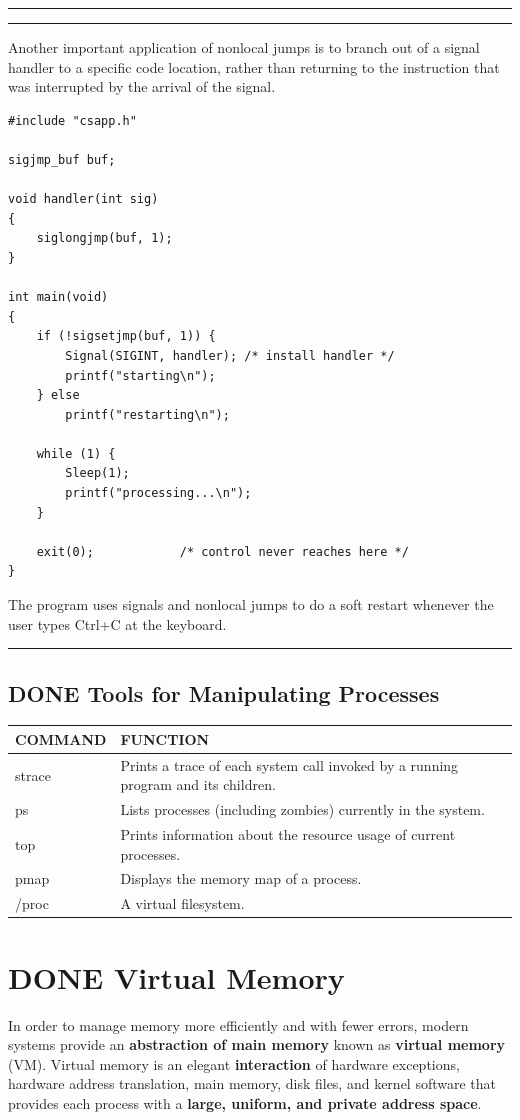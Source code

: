 \documentclass[11pt]{article}
\begin{document}
\noindent\rule{\textwidth}{0.5pt}

\noindent\rule{\textwidth}{0.5pt}
Another important application of nonlocal jumps is to branch out of a signal handler to a specific code location, rather than returning to the instruction that was interrupted by the arrival of the signal.\\
\begin{verbatim}
#include "csapp.h"

sigjmp_buf buf;

void handler(int sig)
{
    siglongjmp(buf, 1);
}

int main(void)
{
    if (!sigsetjmp(buf, 1)) {
        Signal(SIGINT, handler); /* install handler */
        printf("starting\n");
    } else
        printf("restarting\n");

    while (1) {
        Sleep(1);
        printf("processing...\n");
    }

    exit(0);			/* control never reaches here */
}

\end{verbatim}

The program uses signals and nonlocal jumps to do a soft restart whenever the user types Ctrl+C at the keyboard.\\

\noindent\rule{\textwidth}{0.5pt}


\subsection{{\bfseries\sffamily DONE} Tools for Manipulating Processes}
\label{sec:org25badc1}
\begin{center}
\begin{tabular}{ll}
COMMAND & FUNCTION\\
\hline
strace & Prints a trace of each system call invoked by a running program and its children.\\
ps & Lists processes (including zombies) currently in the system.\\
top & Prints information about the resource usage of current processes.\\
pmap & Displays the memory map of a process.\\
/proc & A virtual filesystem.\\
\end{tabular}
\end{center}




\section{{\bfseries\sffamily DONE} Virtual Memory}
\label{sec:orga29f792}
In order to manage memory more efficiently and with fewer errors, modern systems provide an \textbf{abstraction of main memory} known as \textbf{virtual memory} (VM). Virtual memory is an elegant \textbf{interaction} of hardware exceptions, hardware address translation, main memory, disk files, and kernel software that provides each process with a \textbf{large, uniform, and private address space}.\\
\end{document}
